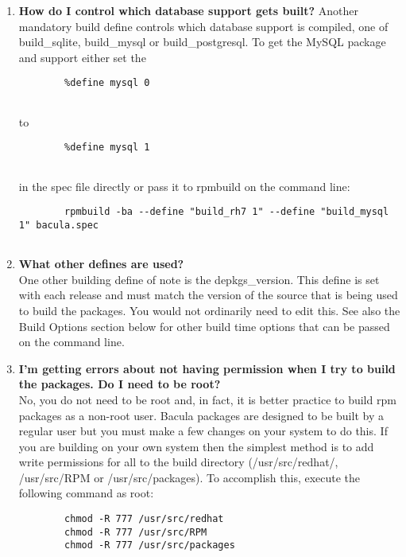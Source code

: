 \begin{enumerate}
\item 
   \label{faq2}
   {\bf How do I control which database support gets built?}
   Another mandatory build define controls which database support is compiled,
   one of  build\_sqlite, build\_mysql or build\_postgresql. To get the MySQL
   package and support either  set the  

\footnotesize
\begin{verbatim}
        %define mysql 0
        
\end{verbatim}
\normalsize

to  

\footnotesize
\begin{verbatim}
        %define mysql 1
        
\end{verbatim}
\normalsize

in the spec file directly or pass it to rpmbuild on the command line:  

\footnotesize
\begin{verbatim}
        rpmbuild -ba --define "build_rh7 1" --define "build_mysql 1" bacula.spec
        
\end{verbatim}
\normalsize

\item 
   \label{faq3}
   {\bf What other defines are used?} \\
   One other building define of note is the depkgs\_version. This define is set with each release and must 
   match the version of the source that is being used to build the packages. 
   You would not ordinarily need to edit this.  See also the Build Options section 
   below for other build time options that can be passed on the command line.
\item 
   \label{faq4}
   {\bf I'm getting errors about not having permission when I try  to build the
   packages. Do I need to be root?} \\
   No, you do not need to be root and, in fact, it is better practice to
   build rpm packages as a non-root user.  Bacula packages are designed to
   be built by a regular user but you must make a few changes on your
   system to do this.  If you are building on your own system then the
   simplest method is to add write permissions for all to the build
   directory (/usr/src/redhat/, /usr/src/RPM or /usr/src/packages).  
   To accomplish this, execute the following command as root:

\footnotesize
\begin{verbatim}
        chmod -R 777 /usr/src/redhat
        chmod -R 777 /usr/src/RPM
        chmod -R 777 /usr/src/packages
        

\end{verbatim}
\end{enumerate}
